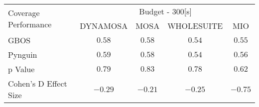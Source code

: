 \begin{tabular}{lcccc}\toprule 
\multirow{2}{*}{Coverage Performance} & \multicolumn{4}{c}{Budget - 300[s] } \\ \cmidrule(lr){2-5}  
                                      & DYNAMOSA&MOSA&WHOLESUITE&MIO                         \\ \midrule 
GBOS                                  & \(0.58\)&\(0.58\)&\(0.54\)&\(0.55\)                       \\ 
Pynguin                               & \(0.59\)&\(0.58\)&\(0.54\)&\(0.56\)                       \\ 
p Value                               & \(0.79\)&\(0.83\)&\(0.78\)&\(0.62\)                     \\ 
Cohen's D Effect Size                 & \(-0.29\)&\(-0.21\)&\(-0.25\)&\(-0.75\)                       \\ 
\bottomrule 
\end{tabular}